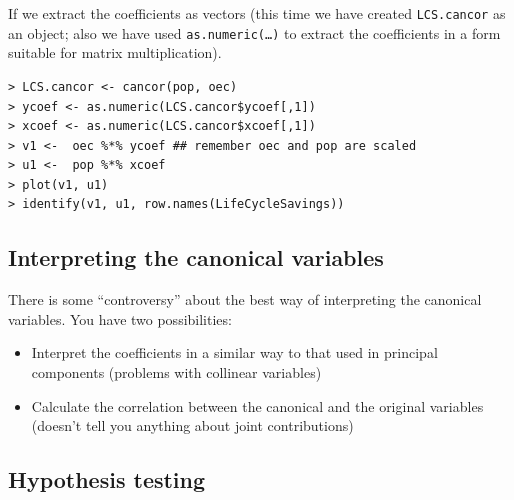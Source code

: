 If we extract the coefficients as vectors (this time we have created \texttt{LCS.cancor} as an object; also we have used \texttt{as.numeric(\ldots)} to extract the coefficients in a form suitable for matrix multiplication).

\singlespacing
\begin{verbatim}
> LCS.cancor <- cancor(pop, oec)
> ycoef <- as.numeric(LCS.cancor$ycoef[,1])
> xcoef <- as.numeric(LCS.cancor$xcoef[,1])
> v1 <-  oec %*% ycoef ## remember oec and pop are scaled
> u1 <-  pop %*% xcoef
> plot(v1, u1)
> identify(v1, u1, row.names(LifeCycleSavings))
\end{verbatim}
\onehalfspacing


\subsection{Interpreting the canonical variables}

There is some ``controversy'' about the best way of interpreting the canonical variables.   You have two possibilities:

\begin{itemize}
\item Interpret the coefficients in a similar way to that used in principal components (problems with collinear variables)
\item Calculate the correlation between the canonical and the original variables (doesn't tell you anything about joint contributions)
\end{itemize}







\subsection{Hypothesis testing}

